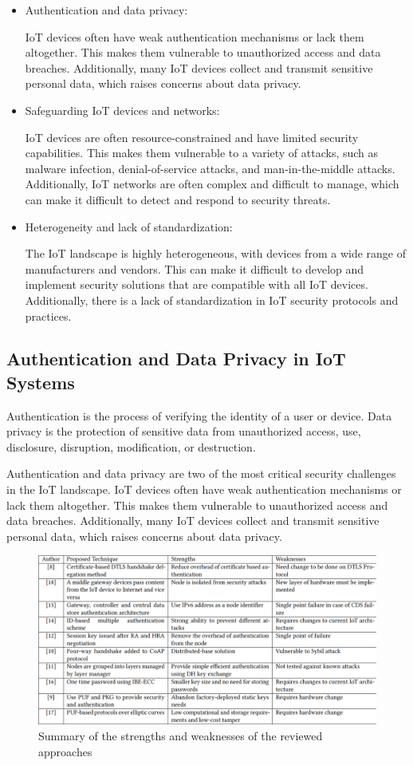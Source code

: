 \documentclass[conference]{IEEEtran}
\begin{document}
\begin{itemize}
    \item Authentication and data privacy: 
    
    IoT devices often have weak authentication mechanisms or lack them altogether. This makes them vulnerable to unauthorized access and data breaches. Additionally, many IoT devices collect and transmit sensitive personal data, which raises concerns about data privacy.
    \item Safeguarding IoT devices and networks: 
    
    IoT devices are often resource-constrained and have limited security capabilities. This makes them vulnerable to a variety of attacks, such as malware infection, denial-of-service attacks, and man-in-the-middle attacks. Additionally, IoT networks are often complex and difficult to manage, which can make it difficult to detect and respond to security threats.
    \item Heterogeneity and lack of standardization: 
    
    The IoT landscape is highly heterogeneous, with devices from a wide range of manufacturers and vendors. This can make it difficult to develop and implement security solutions that are compatible with all IoT devices. Additionally, there is a lack of standardization in IoT security protocols and practices.
\end{itemize}

\subsection{Authentication and Data Privacy in IoT Systems}

Authentication is the process of verifying the identity of a user or device. Data privacy is the protection of sensitive data from unauthorized access, use, disclosure, disruption, modification, or destruction.

Authentication and data privacy are two of the most critical security challenges in the IoT landscape. IoT devices often have weak authentication mechanisms or lack them altogether. This makes them vulnerable to unauthorized access and data breaches. Additionally, many IoT devices collect and transmit sensitive personal data, which raises concerns about data privacy.

\begin{figure}
    \centering
    \includegraphics[width=0.9\linewidth]{image.png}
    \caption{Summary of the strengths and weaknesses of the reviewed approaches}
    \label{fig:enter-label}
\end{figure}
\end{document}
